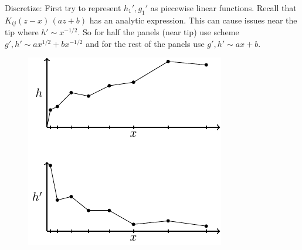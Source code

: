 \documentclass{article}
\begin{document}
Discretize: First try to represent $h_1', g_1'$ as piecewise linear functions.
Recall that $K_{ij}(z-x)\,(az+b)$ has an analytic expression.
This can cause issues near the tip where $h' \sim x^{-1/2}$. So for half the
panels (near tip) use scheme $g', h' \sim ax^{1/2} + bx^{-1/2}$ and for the
rest of the panels use $g',h' \sim ax +b$.
\begin{figure}[!ht]\centering
\includegraphics{Fig8.pdf}
\end{figure}
%
%
%
%
%
%
\end{document}
